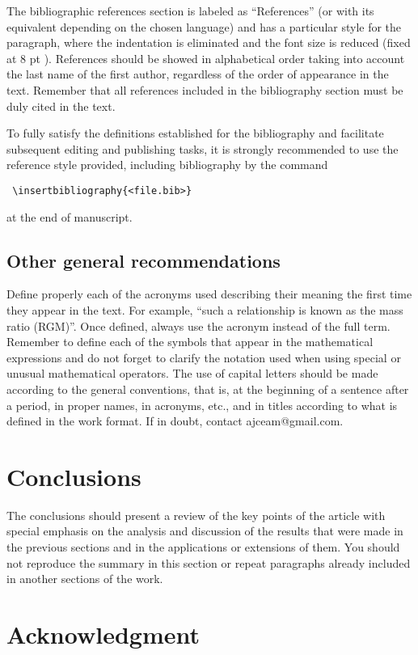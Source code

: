 \documentclass[eng]{ajceam-class}
\begin{document}
The bibliographic references section is labeled as ``References'' (or with its equivalent depending on the chosen language) and has a particular style for the paragraph, where the indentation is eliminated and the font size is reduced (fixed at 8 pt ). References should be showed in alphabetical order taking into account the last name of the first author, regardless of the order of appearance in the text. Remember that all references included in the bibliography section must be duly cited in the text.

To fully satisfy the definitions established for the bibliography and facilitate subsequent editing and publishing tasks, it is strongly recommended to use the reference style provided, including bibliography by the command
\begin{verbatim}
 \insertbibliography{<file.bib>} 
\end{verbatim}
at the end of manuscript.

\subsection{Other general recommendations}

Define properly each of the acronyms used describing their meaning the first time they appear in the text. For example, ``such a relationship is known as the mass ratio (RGM)''. Once defined, always use the acronym instead of the full term. Remember to define each of the symbols that appear in the mathematical expressions and do not forget to clarify the notation used when using special or unusual mathematical operators. The use of capital letters should be made according to the general conventions, that is, at the beginning of a sentence after a period, in proper names, in acronyms, etc., and in titles according to what is defined in the work format. If in doubt, contact ajceam@gmail.com.


\section{Conclusions}

The conclusions should present a review of the key points of the article with special emphasis on the analysis and discussion of the results that were made in the previous sections and in the applications or extensions of them. You should not reproduce the summary in this section or repeat paragraphs already included in another sections of the work.

\section{Acknowledgment}
\end{document}

